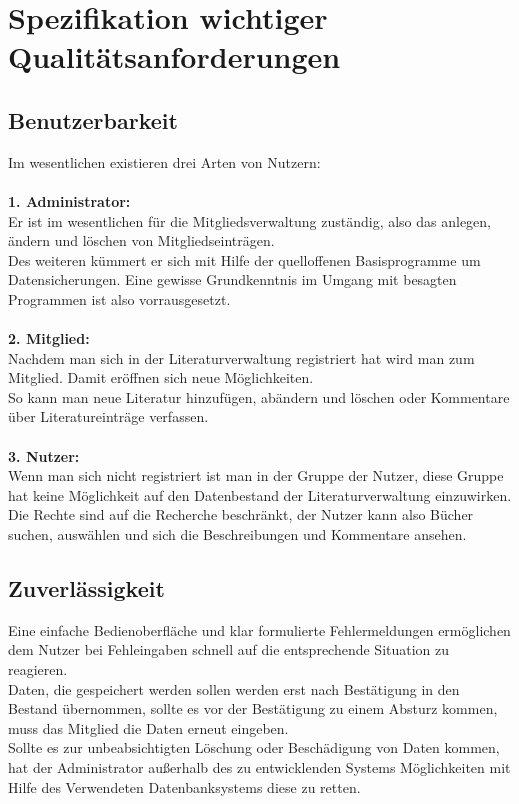 \chapter{Spezifikation wichtiger Qualitätsanforderungen}
\section{Benutzerbarkeit}
Im wesentlichen existieren drei Arten von Nutzern: \\
\\
\textbf{1. Administrator:} \\
Er ist im wesentlichen f\"ur die Mitgliedsverwaltung zust\"andig, also das anlegen, \"andern und l\"oschen von Mitgliedseintr\"agen. \\
Des weiteren k\"ummert er sich mit Hilfe der quelloffenen Basisprogramme um Datensicherungen. Eine gewisse Grundkenntnis im Umgang mit
besagten Programmen ist also vorrausgesetzt. \\
\\
\textbf{2. Mitglied:} \\
Nachdem man sich in der Literaturverwaltung registriert hat wird man zum Mitglied. Damit er\"offnen sich neue M\"oglichkeiten. \\
So kann man neue Literatur hinzuf\"ugen, ab\"andern und l\"oschen oder Kommentare \"uber Literatureintr\"age verfassen.\\
\\
\textbf{3. Nutzer:} \\
Wenn man sich nicht registriert ist man in der Gruppe der Nutzer, diese Gruppe hat keine M\"oglichkeit auf den Datenbestand der Literaturverwaltung einzuwirken.\\
Die Rechte sind auf die Recherche beschr\"ankt, der Nutzer kann also B\"ucher suchen, ausw\"ahlen und sich die Beschreibungen und Kommentare ansehen.
\section{Zuverlässigkeit}
Eine einfache Bedienoberfl\"ache und klar formulierte Fehlermeldungen erm\"oglichen dem Nutzer bei Fehleingaben schnell auf die entsprechende Situation zu reagieren.\\
Daten, die gespeichert werden sollen werden erst nach Best\"atigung in den Bestand \"ubernommen, sollte es vor der Best\"atigung zu einem Absturz kommen, muss das Mitglied die Daten erneut eingeben. \\
Sollte es zur unbeabsichtigten L\"oschung oder Besch\"adigung von Daten kommen, hat der Administrator au\ss erhalb des zu entwicklenden Systems M\"oglichkeiten mit Hilfe des Verwendeten Datenbanksystems diese zu retten.
